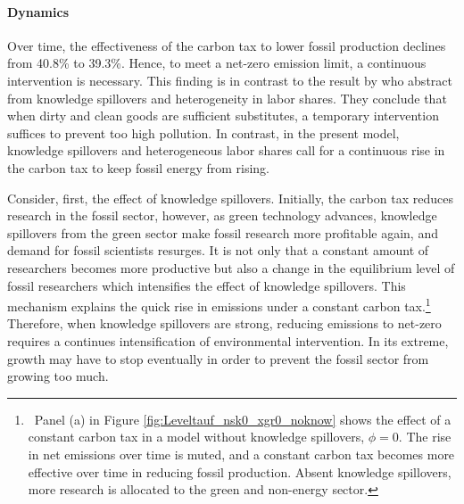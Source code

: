 \paragraph{Dynamics}

Over time, the effectiveness of the carbon tax to lower fossil production declines from 40.8\% to 39.3\%. Hence, to meet a net-zero emission limit, a continuous intervention is necessary. 
This finding is in contrast to the result by \cite{Acemoglu2012TheChange} who abstract from knowledge spillovers and heterogeneity in labor shares. They conclude that when dirty and clean goods are sufficient substitutes, a temporary intervention suffices to prevent too high pollution. In contrast, in the present model, knowledge spillovers and heterogeneous labor shares 
call for a continuous rise in the carbon tax to keep fossil energy from rising. 

Consider, first, the effect of knowledge spillovers.
Initially, the carbon tax reduces research in the fossil sector, however, as green technology advances, knowledge spillovers from the green sector make fossil research more profitable again, and demand for fossil scientists resurges.
It is not only that a constant amount of researchers becomes more productive but also a change in the equilibrium level of fossil researchers which intensifies the effect of knowledge spillovers. This mechanism explains the quick rise in emissions under a constant carbon tax.\footnote{\ Panel (a) in Figure \ref{fig:Leveltauf_nsk0_xgr0_noknow} shows the effect of a constant carbon tax in a model without knowledge spillovers, $\phi=0$. The rise in net emissions over time is muted, and a constant carbon tax becomes more effective over time in reducing fossil production.  Absent knowledge spillovers, more research is allocated to the green and non-energy sector.} 
Therefore, when knowledge spillovers are strong, reducing emissions to net-zero requires a continues intensification of environmental intervention. In its extreme, growth may have to stop eventually in order to prevent the fossil sector from growing too much.

